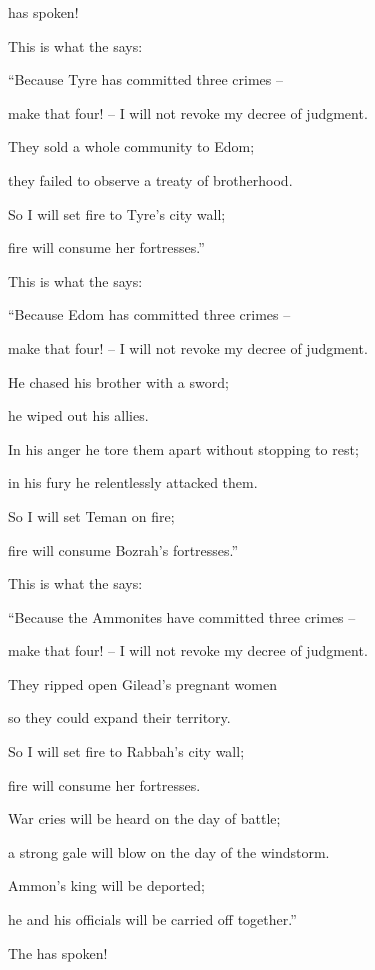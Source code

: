 {{}
has spoken!
\par }{\Q {}This is what
the {}
says:
\par }{\Q “Because
Tyre
has committed three crimes –
\par }{\Q make that four! – I will not revoke my decree of judgment.
\par }{\Q They sold a whole community to Edom;
\par }{\Q they failed to observe a treaty of brotherhood.
\par }{\Q {}So
I will set
fire
to Tyre’s
city wall;
\par }{\Q fire will consume
her fortresses.”
\par }{\Q {}This is what
the
{}
says:
\par }{\Q “Because Edom
has committed three
crimes –
\par }{\Q make that four! – I will not revoke my decree of judgment.
\par }{\Q He chased his brother with a sword;
\par }{\Q he wiped out his allies.
\par }{\Q In his anger he tore them apart without stopping to rest;
\par }{\Q in his fury he relentlessly attacked them.
\par }{\Q {}So I will set
Teman
on fire;
\par }{\Q fire will consume
Bozrah’s
fortresses.”
\par }{\Q {}This is what the
{}
says:
\par }{\Q “Because the Ammonites
have committed three
crimes –
\par }{\Q make that four! – I will not revoke my decree of judgment.
\par }{\Q They ripped open Gilead’s pregnant women
\par }{\Q so they could expand their territory.
\par }{\Q {}So I will set
fire
to Rabbah’s
city wall;
\par }{\Q fire will consume
her fortresses.
\par }{\Q War cries
will be heard on the day
of battle;
\par }{\Q a strong gale
will blow on the day
of the windstorm.
\par }{\Q {}Ammon’s
king
will be deported;
\par }{\Q he
and his officials
will be carried off together.”
\par }{\Q The
{} has spoken!

}
